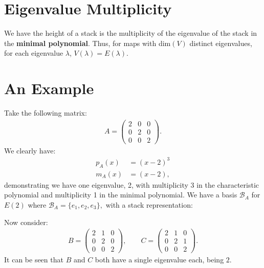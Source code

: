 \documentclass[a4paper, 12pt, twoside]{article}
\begin{document}
\section{Eigenvalue Multiplicity}

We have the height of a stack is the multiplicity of the eigenvalue of the stack 
in the \textbf{minimal polynomial}. Thus, for maps with dim$(V)$ distinct eigenvalues,
for each eigenvalue $\lambda$, $V(\lambda) = E(\lambda)$.

\newpage

\section{An Example}

Take the following matrix: \begin{gather*}
    A = \begin{pmatrix}
        2 & 0 & 0 \\
        0 & 2 & 0 \\
        0 & 0 & 2
    \end{pmatrix}.
\end{gather*} We clearly have: \begin{align*}
    p_A(x) &= (x - 2)^3 \\
    m_A(x) &= (x - 2),
\end{align*} demonstrating we have one eigenvalue, 2, with multiplicity 3 in the
characteristic polynomial and multiplicity 1 in the minimal polynomial. We have
a basis $\mathcal{B}_A$ for $E(2)$ where $\mathcal{B}_A = \{e_1, e_2, e_3\},$ 
with a stack representation: \begin{center}
\end{center} Now consider: \begin{gather*}
    B = \begin{pmatrix}
        2 & 1 & 0 \\
        0 & 2 & 0 \\
        0 & 0 & 2
    \end{pmatrix}, \qquad
    C = \begin{pmatrix}
        2 & 1 & 0 \\
        0 & 2 & 1 \\
        0 & 0 & 2
    \end{pmatrix}.
\end{gather*} It can be seen that $B$ and $C$ both have a single eigenvalue each, being $2$.
\end{document}
